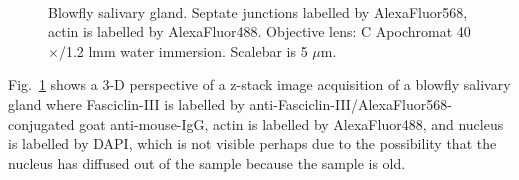 \begin{figure}[h!]
\centering
{}\hspace{0.1em}
\hspace{0.1em}
\\
\caption{Blowfly salivary gland. 
Septate junctions labelled by AlexaFluor568, actin is labelled by AlexaFluor488. 
Objective lens: C Apochromat 40$\times$/1.2 lmm water immersion. 
Scalebar is 5 $\mu$m.}
\label{fig:what}
\end{figure}


Fig.~\ref{fig:what} shows a 3-D perspective of a z-stack image acquisition of a blowfly salivary gland where Fasciclin-III is labelled by anti-Fasciclin-III/AlexaFluor568-conjugated goat anti-mouse-IgG, actin is labelled by AlexaFluor488, and nucleus is labelled by DAPI, which is not visible perhaps due to the possibility that the nucleus has diffused out of the sample because the sample is old. 

